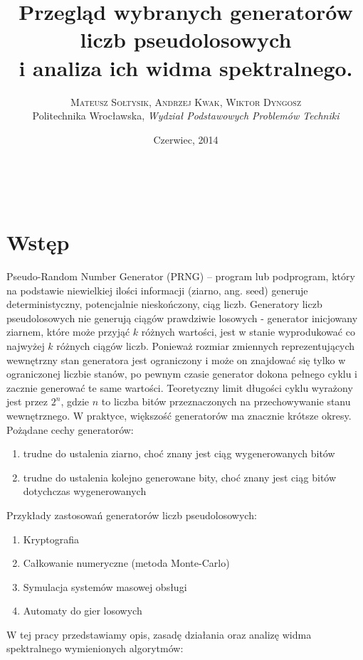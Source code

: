 \documentclass[a4paper, 11pt]{article} %
\title{\textbf{Przegląd wybranych generatorów liczb pseudolosowych}\\ %
i analiza ich widma spektralnego.} %
\author{\textsc{Mateusz Sołtysik, Andrzej Kwak, Wiktor Dyngosz} %
\\{Politechnika Wrocławska, \textit{Wydział Podstawowych Problemów Techniki}}} %
\date{Czerwiec, 2014} %
\makeatletter
\renewcommand{\maketitle}{ %
\begin{flushright} %
{\LARGE\@title} %

\vspace{50pt} %

{\large\@author} %
\\\@date %

\vspace{40pt} %
\end{flushright}
}
\makeatother
\begin{document}
\maketitle %



\section*{Wstęp}
Pseudo-Random Number Generator (PRNG) – program lub podprogram, który na podstawie niewielkiej ilości informacji (ziarno, ang. seed) generuje deterministyczny, potencjalnie nieskończony, ciąg liczb. Generatory liczb pseudolosowych nie generują ciągów prawdziwie losowych - generator inicjowany ziarnem, które może przyjąć $k$ różnych wartości, jest w stanie wyprodukować co najwyżej $k$ różnych ciągów liczb. Ponieważ rozmiar zmiennych reprezentujących wewnętrzny stan generatora jest ograniczony i może on znajdować się tylko w ograniczonej liczbie stanów, po pewnym czasie generator dokona pełnego cyklu i zacznie generować te same wartości. Teoretyczny limit długości cyklu wyrażony jest przez $2^n$, gdzie $n$ to liczba bitów przeznaczonych na przechowywanie stanu wewnętrznego. W praktyce, większość generatorów ma znacznie krótsze okresy.
\\Pożądane cechy generatorów:
\begin{enumerate}
\item trudne do ustalenia ziarno, choć znany jest ciąg wygenerowanych bitów
\item trudne do ustalenia kolejno generowane bity, choć znany jest ciąg bitów dotychczas wygenerowanych
\end{enumerate}
Przykłady zastosowań generatorów liczb pseudolosowych:
\begin{enumerate}
\item Kryptografia
\item Całkowanie numeryczne (metoda Monte-Carlo)
\item Symulacja systemów masowej obsługi
\item Automaty do gier losowych
\end{enumerate}
W tej pracy przedstawiamy opis, zasadę działania oraz analizę widma spektralnego wymienionych algorytmów:
\end{document}

